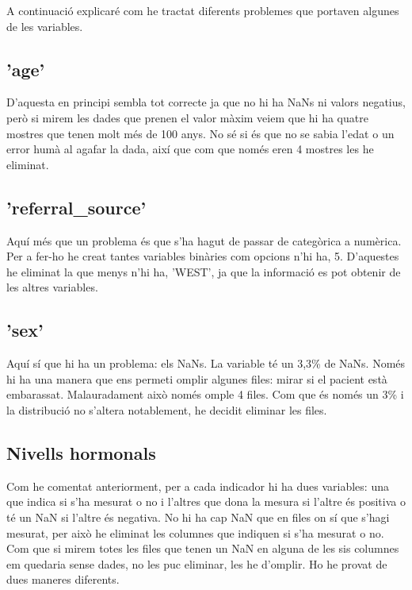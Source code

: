 \documentclass[9pt,a4paper,twoside]{tau-class/tau}
\begin{document}
    A continuació explicaré com he tractat diferents problemes que portaven algunes de les variables.
    \subsection{'age'}
    D'aquesta en principi sembla tot correcte ja que no hi ha NaNs ni valors negatius, però si mirem les dades que prenen el valor màxim veiem que hi ha quatre mostres que tenen molt més de 100 anys. No sé si és que no se sabia l'edat o un error humà al agafar la dada, així que com que només eren 4 mostres les he eliminat.

    \subsection{'referral\_source'}
    Aquí més que un problema és que s'ha hagut de passar de categòrica a numèrica. Per a fer-ho he creat tantes variables binàries com opcions n'hi ha, 5. D'aquestes he eliminat la que menys n'hi ha, 'WEST', ja que la informació es pot obtenir de les altres variables.

    \subsection{'sex'}
    Aquí sí que hi ha un problema: els NaNs. La variable té un 3,3\% de NaNs. Només hi ha una manera que ens permeti omplir algunes files: mirar si el pacient està embarassat. Malauradament això només omple 4 files. Com que és només un 3\% i la distribució no s'altera notablement, he decidit eliminar les files.

    \subsection{Nivells hormonals}
    Com he comentat anteriorment, per a cada indicador hi ha dues variables: una que indica si s'ha mesurat o no i l'altres que dona la mesura si l'altre és positiva o té un NaN si l'altre és negativa. No hi ha cap NaN que en files on sí que s'hagi mesurat, per això he eliminat les columnes que indiquen si s'ha mesurat o no. Com que si mirem totes les files que tenen un NaN en alguna de les sis columnes em quedaria sense dades, no les puc eliminar, les he d'omplir. Ho he provat de dues maneres diferents.
\end{document}
